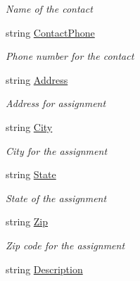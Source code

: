 \begin{DoxyCompactItemize}
\begin{DoxyCompactList}\small\item\em Name of the contact \end{DoxyCompactList}\item 
string \hyperlink{class_field_service_1_1_data_1_1_assignment_history_a3604f8248bc1fe213653c223a3ae660e}{Contact\+Phone}
\begin{DoxyCompactList}\small\item\em Phone number for the contact \end{DoxyCompactList}\item 
string \hyperlink{class_field_service_1_1_data_1_1_assignment_history_a5720ed97ec12bfcc619225b25e559074}{Address}
\begin{DoxyCompactList}\small\item\em Address for assignment \end{DoxyCompactList}\item 
string \hyperlink{class_field_service_1_1_data_1_1_assignment_history_aa8b6487e70fa9f2fc46e25ce101c8e10}{City}
\begin{DoxyCompactList}\small\item\em City for the assignment \end{DoxyCompactList}\item 
string \hyperlink{class_field_service_1_1_data_1_1_assignment_history_a7ee8042b0318061d9411f0cdf6ac319f}{State}
\begin{DoxyCompactList}\small\item\em State of the assignment \end{DoxyCompactList}\item 
string \hyperlink{class_field_service_1_1_data_1_1_assignment_history_a634f6264e5bc1fbb9d9f59ec7785934e}{Zip}
\begin{DoxyCompactList}\small\item\em Zip code for the assignment \end{DoxyCompactList}\item 
string \hyperlink{class_field_service_1_1_data_1_1_assignment_history_a36b09d038bd956bc43707627a9b27527}{Description}

\end{DoxyCompactItemize}
